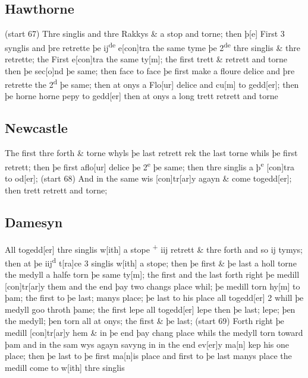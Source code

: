 \documentclass[12pt,letter]{article} %
\newcommand{\srcpg}[1]{(start #1)}
\begin{document}
\subsection{Hawthorne}
\srcpg{67} Thre singlis and thre Rakkys \& a
stop and torne; then þ{[}e{]} First 3 synglis and þre retrette þe
ij\textsuperscript{de} e{[}con{]}tra the same tyme þe
2\textsuperscript{de} thre singlis \& thre retrette; the First
e{[}con{]}tra the same ty{[}m{]}; the first trett \& retrett and torne
then þe sec{[}o{]}nd þe same; then face to face þe first make a floure
delice and þre retrette the 2\textsuperscript{d} þe same; then at onys a
Flo{[}ur{]} delice and cu{[}m{]} to gedd{[}er{]}; then þe horne horne
pepy to gedd{[}er{]} then at onys a long trett retrett and torne

\subsection{Newcastle}
The first thre forth \& torne whyls þe last retrett rek the last torne
whils þe first retrett; then þe first aflo{[}ur{]} delice þe
2\textsuperscript{e} þe same; then thre singlis a þ\textsuperscript{e}
{[}con{]}tra to od{[}er{]}; \srcpg{68} And in the same wis
{[}con{]}tr{[}ar{]}y agayn \& come togedd{[}er{]}; then trett retrett
and torne;

\subsection{Damesyn}
All togedd{[}er{]} thre singlis w{[}ith{]} a stope \textsuperscript{+}
iij retrett \& thre forth and so ij tymys; then at þe
\reversemarginpar{}iij\textsuperscript{d} t{[}ra{]}ce 3 singlis w{[}ith{]} a stope; then þe
first \& þe last a holl torne the medyll a halfe torn þe same ty{[}m{]};
the first and the last forth right þe medill {[}con{]}tr{[}ar{]}y them
and the end þay two changs place whil; þe medill torn hy{[}m{]} to þam;
the first to þe last; manys place; þe last to his place all
togedd{[}er{]} 2 whill þe medyll goo throth þame; the first lepe all
togedd{[}er{]} lepe then þe last; lepe; þen the medyll; þen torn all at
onys; the first \& þe last; \srcpg{69} Forth right þe medill
{[}con{]}tr{[}ar{]}y hem \& in þe end þay chang place whils the medyll
torn toward þam and in the sam wys agayn savyng in in the end
ev{[}er{]}y ma{[}n{]} kep his one place; then þe last to þe first
ma{[}n{]}is place and first to þe last manys place the medill come to
w{[}ith{]} thre singlis
\end{document}
